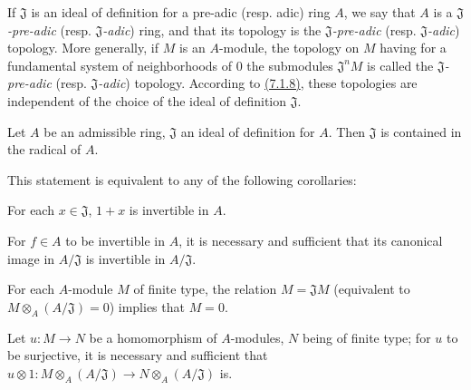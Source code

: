 If $\mathfrak{J}$ is an ideal of definition for a pre-adic (resp. adic) ring
$A$, we say that $A$ is a {\em $\mathfrak{J}$-pre-adic}
(resp. {\em $\mathfrak{J}$-adic}) ring, and that its topology is the
{\em $\mathfrak{J}$-pre-adic} (resp. {\em $\mathfrak{J}$-adic}) topology. More
generally, if $M$ is an $A$-module, the topology on $M$ having for a fundamental
system of neighborhoods of $0$ the submodules $\mathfrak{J}^n M$ is called the
{\em $\mathfrak{J}$-pre-adic} (resp. {\em $\mathfrak{J}$-adic}) topology.
According to \hyperref[cor-0.7.1.8]{(7.1.8)}, these topologies are independent of the choice
of the ideal of definition $\mathfrak{J}$.

\begin{prop}[7.1.10]
\label{prop-0.7.1.10}
Let $A$ be an admissible ring, $\mathfrak{J}$ an ideal of definition for $A$.
Then $\mathfrak{J}$ is contained in the radical of $A$.
\end{prop}

This statement is equivalent to any of the following corollaries:
\begin{cor}[7.1.11]
\label{cor-0.7.1.11}
For each $x\in\mathfrak{J}$, $1+x$ is invertible in $A$.
\end{cor}

\begin{cor}[7.1.12]
\label{cor-0.7.1.12}
For $f\in A$ to be invertible in $A$, it is necessary and sufficient that its
canonical image in $A/\mathfrak{J}$ is invertible in $A/\mathfrak{J}$.
\end{cor}

\begin{cor}[7.1.13]
\label{cor-0.7.1.13}
For each $A$-module $M$ of finite type, the relation $M=\mathfrak{J}M$
(equivalent to $M\otimes_A(A/\mathfrak{J})=0$) implies that $M=0$.
\end{cor}

\begin{cor}[7.1.14]
\label{cor-0.7.1.14}
Let $u:M\to N$ be a homomorphism of $A$-modules, $N$ being of finite type; for
$u$ to be surjective, it is necessary and sufficient that
$u\otimes 1:M\otimes_A(A/\mathfrak{J})\to N\otimes_A(A/\mathfrak{J})$ is.
\end{cor}

